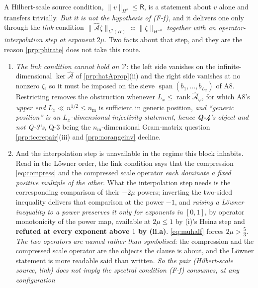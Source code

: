 \begin{lemma}
\begin{enumerate}
A Hilbert-scale source condition, $\|v\|_{H^{s}}\le\mathsf R$, is a statement about $v$ alone and
transfers trivially. \emph{But it is not the hypothesis of \textup{(F-f)}}, and it delivers one only
through the \emph{link} condition $\|\hat{\mathcal A}\zeta\|_{L^{2}(\Pi)}\asymp\|\zeta\|_{H^{-a}}$
\emph{together with an operator-interpolation step at exponent $2\mu$}. Two facts about that step, and
they are the reason \cref{prp:phirate} does not take this route.
\begin{enumerate}
\item[(iii.a)] \emph{The link condition cannot hold on $\mathcal V$}: the left side vanishes on the
infinite-dimensional $\ker\hat{\mathcal A}$ of \cref{prp:hatAprop}(ii) and the right side vanishes at no
nonzero $\zeta$, so it must be imposed on the sieve $\operatorname{span}(b_1,\dots,b_{L_x})$ of A8.
Restricting removes the obstruction whenever $L_x\le\operatorname{rank}\hat{\mathcal A}_\varphi$, for
which A8's \emph{upper end} $L_x\ll n^{1/2}\le n_{\mathrm m}$ is sufficient in generic position, 
\emph{and ``generic position'' is an $L_x$-dimensional injectivity statement, hence \textbf{Q-4}'s
object and not Q-3's}, Q-3 being the $n_{\mathrm m}$-dimensional Gram-matrix question
\cref{prp:tccrepair}(iii) and \cref{prp:norangeinv} decline.
\item[(iii.b)] And the interpolation step is unavailable in the regime this block inhabits. Read
in the Löwner order, the link condition says that the compression \eqref{eq:compress} and the compressed
scale operator \emph{each dominate a fixed positive multiple of the other}. What the interpolation step
needs is the corresponding comparison of their $-2\mu$ powers; inverting the two-sided inequality
delivers that comparison at the power $-1$, and \emph{raising a Löwner inequality to a power preserves
it only for exponents in $[0,1]$}, by operator monotonicity of the power map, available at
$2\mu\le1$ by (i)'s Heinz step and \textbf{refuted at every exponent above $1$ by (ii.a)}.
\eqref{eq:muhalf} forces $2\mu>\tfrac53$.
\emph{The two operators are named rather than symbolised}: the
compression and the compressed scale operator are the objects the clause is about, and the L\"owner
statement is more readable said than written. \emph{So the pair
(Hilbert-scale source, link) does not imply the spectral condition (F-f) consumes, at any configuration
}
\end{enumerate}
\end{enumerate}
\end{lemma}
